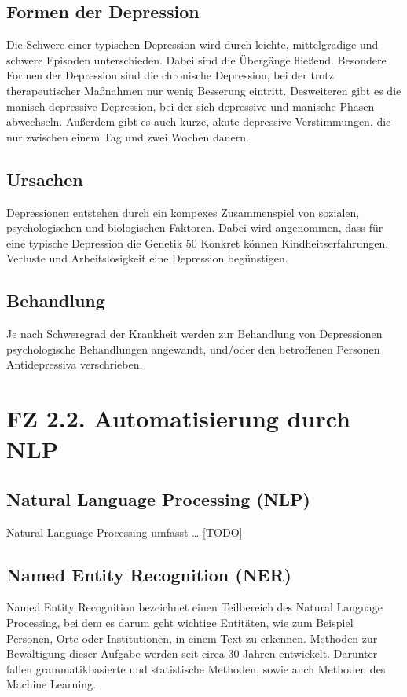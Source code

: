 \subsection{Formen der Depression}
Die Schwere einer typischen Depression wird durch leichte, mittelgradige und schwere Episoden unterschieden. Dabei 
sind die Übergänge fließend.
Besondere Formen der Depression sind die chronische Depression, bei der trotz therapeutischer Maßnahmen nur wenig 
Besserung eintritt. Desweiteren gibt es die manisch-depressive Depression, bei der sich depressive und manische 
Phasen abwechseln. Außerdem gibt es auch kurze, akute depressive Verstimmungen, die nur zwischen einem Tag und
zwei Wochen dauern. 

\subsection{Ursachen}
Depressionen entstehen durch ein kompexes Zusammenspiel von sozialen, psychologischen und biologischen Faktoren.
Dabei wird angenommen, dass für eine typische Depression die Genetik 50%
Konkret können Kindheitserfahrungen, Verluste und Arbeitslosigkeit eine Depression begünstigen.

\subsection{Behandlung}
Je nach Schweregrad der Krankheit werden zur Behandlung von Depressionen psychologische Behandlungen angewandt, 
und/oder den betroffenen Personen Antidepressiva verschrieben.


%
%
\section{FZ 2.2. Automatisierung durch NLP}
\label{sec:fz2.2.} 

\subsection{Natural Language Processing (NLP)}
Natural Language Processing umfasst \dots{} [TODO]

\subsection{Named Entity Recognition (NER)}
Named Entity Recognition bezeichnet einen Teilbereich des Natural Language Processing, bei dem es darum geht 
wichtige Entitäten, wie zum Beispiel Personen, Orte oder Institutionen, in einem Text zu erkennen. Methoden 
zur Bewältigung dieser Aufgabe werden seit circa 30 Jahren entwickelt. Darunter fallen grammatikbasierte und 
statistische Methoden, sowie auch Methoden des Machine Learning.


